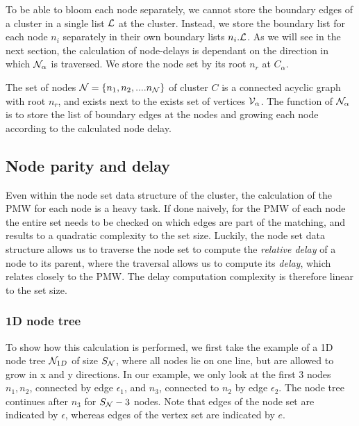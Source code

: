 To be able to bloom each node separately, we cannot store the boundary edges of a cluster in a single list $\mathcal{L}$ at the cluster. Instead, we store the boundary list for each node $n_i$ separately in their own boundary lists $n_i.\mathcal{L}$. As we will see in the next section, the calculation of node-delays is dependant on the direction in which $\mathcal{N}_\alpha$ is traversed. We store the node set by its root $n_r$ at $C_\alpha$.

\begin{theorem}
  The set of nodes $\mathcal{N} = \{n_1, n_2, .... n_{\mathcal{N}}\}$ of cluster $C$ is a connected acyclic graph with root $n_r$, and exists next to the exists set of vertices $\mathcal{V}_\alpha$. The function of $\mathcal{N}_\alpha$ is to store the list of boundary edges at the nodes and growing each node according to the calculated node delay.
\end{theorem}


\subsection{Node parity and delay}\label{sec:nodedelay}

Even within the node set data structure of the cluster, the calculation of the PMW for each node is a heavy task. If done naively, for the PMW of each node the entire set needs to be checked on which edges are part of the matching, and results to a quadratic complexity to the set size. Luckily, the node set data structure allows us to traverse the node set to compute the \emph{relative delay} of a node to its parent, where the traversal allows us to compute its \emph{delay}, which relates closely to the PMW. The delay computation complexity is therefore linear to the set size.

\subsubsection{1D node tree}
To show how this calculation is performed, we first take the example of a 1D node tree $\mathcal{N}_{1D}$ of size $S_{\mathcal{N}}$, where all nodes lie on one line, but are allowed to grow in x and y directions. In our example, we only look at the first 3 nodes $n_1, n_2$, connected by edge $\epsilon_{1}$, and $n_3$, connected to $n_2$ by edge $\epsilon_{2}$. The node tree continues after $n_3$ for $S_{\mathcal{N}} - 3$ nodes. Note that edges of the node set are indicated by $\epsilon$, whereas edges of the vertex set are indicated by $e$.

